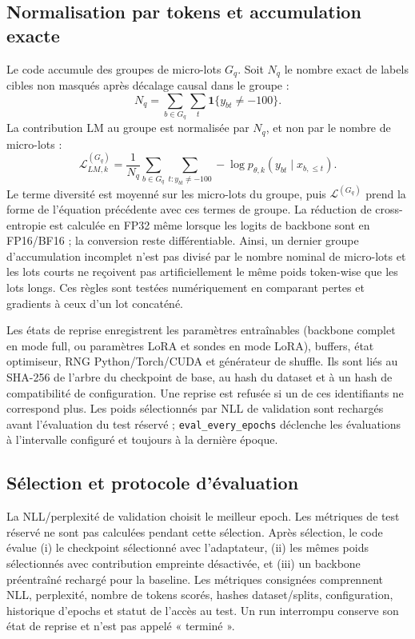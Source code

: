 \documentclass[11pt,a4paper]{article}
\begin{document}
\subsection{Normalisation par tokens et accumulation exacte}
Le code accumule des groupes de micro-lots \(G_q\). Soit \(N_q\) le nombre exact de labels cibles non masqués après décalage causal dans le groupe :
\[
N_q=\sum_{b\in G_q}\sum_t\mathbf 1\{y_{bt}\ne -100\}.
\]
La contribution LM au groupe est normalisée par \(N_q\), et non par le nombre de micro-lots :
\[
\mathcal L_{LM,k}^{(G_q)}=\frac{1}{N_q}\sum_{b\in G_q}\sum_{t:y_{bt}\ne-100}-\log p_{\theta,k}(y_{bt}\mid x_{b,\le t}).
\]
Le terme diversité est moyenné sur les micro-lots du groupe, puis \(\mathcal L^{(G_q)}\) prend la forme de l'équation précédente avec ces termes de groupe. La réduction de cross-entropie est calculée en FP32 même lorsque les logits de backbone sont en FP16/BF16 ; la conversion reste différentiable. Ainsi, un dernier groupe d'accumulation incomplet n'est pas divisé par le nombre nominal de micro-lots et les lots courts ne reçoivent pas artificiellement le même poids token-wise que les lots longs. Ces règles sont testées numériquement en comparant pertes et gradients à ceux d'un lot concaténé.

Les états de reprise enregistrent les paramètres entraînables (backbone complet en mode full, ou paramètres LoRA et sondes en mode LoRA), buffers, état optimiseur, RNG Python/Torch/CUDA et générateur de shuffle. Ils sont liés au SHA-256 de l'arbre du checkpoint de base, au hash du dataset et à un hash de compatibilité de configuration. Une reprise est refusée si un de ces identifiants ne correspond plus. Les poids sélectionnés par NLL de validation sont rechargés avant l'évaluation du test réservé ; \texttt{eval\_every\_epochs} déclenche les évaluations à l'intervalle configuré et toujours à la dernière époque.

\subsection{Sélection et protocole d'évaluation}
La NLL/perplexité de validation choisit le meilleur epoch. Les métriques de test réservé ne sont pas calculées pendant cette sélection. Après sélection, le code évalue (i) le checkpoint sélectionné avec l'adaptateur, (ii) les mêmes poids sélectionnés avec contribution empreinte désactivée, et (iii) un backbone préentraîné rechargé pour la baseline. Les métriques consignées comprennent NLL, perplexité, nombre de tokens scorés, hashes dataset/splits, configuration, historique d'epochs et statut de l'accès au test. Un run interrompu conserve son état de reprise et n'est pas appelé « terminé ».
\end{document}
